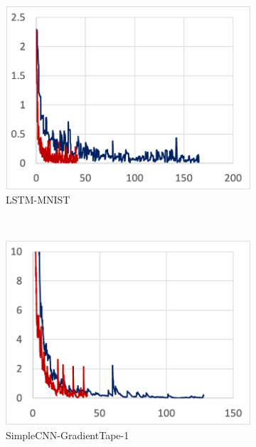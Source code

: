 \begin{figure}[!ht]
  \centering
  \begin{subfigure}[t]{.24\textwidth}
    \includegraphics[width=\textwidth]{tape-lstm}
    \caption{LSTM-MNIST}
  \end{subfigure}
  ~
  \begin{subfigure}[t]{.24\textwidth}
    \includegraphics[width=\textwidth]{tape-simple1}
    \caption{SimpleCNN-GradientTape-1}
  \end{subfigure} 
  ~ 
  \begin{subfigure}[t]{.24\textwidth}

\end{subfigure}
\end{figure}
